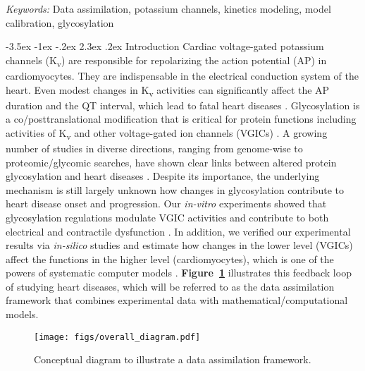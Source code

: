 \documentclass[11pt]{article}
\makeatletter
\renewcommand\section{\@startsection {section}{1}{\z@}%
                                   {-3.5ex \@plus -1ex \@minus -.2ex}%
                                   {2.3ex \@plus.2ex}%
                                   {\normalfont\fontfamily{phv}\fontsize{16}{19}\bfseries}}
\makeatother
\begin{document}
\noindent%
{\it Keywords:} Data assimilation, potassium channels, kinetics modeling, model calibration, glycosylation

{} %

\section{Introduction}
Cardiac voltage-gated potassium channels (K\textsubscript{v}) are responsible for repolarizing the action potential (AP) in cardiomyocytes. They are indispensable in the electrical conduction system of the heart. Even modest changes in K\textsubscript{v} activities can significantly affect the AP duration and the QT interval, which lead to fatal heart diseases \citep{ravens2008role}. Glycosylation is a co/posttranslational modification that is critical for protein functions including activities of K\textsubscript{v} and other voltage-gated ion channels (VGICs) \citep{ohtsubo2006glycosylation,ednie2012modulation}. A growing number of studies in diverse directions, ranging from genome-wise to proteomic/glycomic searches, have shown clear links between altered protein glycosylation and heart diseases \citep{yung2004gene,yang2015glycoproteins,miura2016glycomics,nagai2016aberrant}. Despite its importance, the underlying mechanism is still largely unknown how changes in glycosylation contribute to heart disease onset and progression. Our \textit{in-vitro} experiments showed that glycosylation regulations modulate VGIC activities and contribute to both electrical and contractile dysfunction \citep{ednie2013sialicNav1,ednie2015sialicKv,ednie2019reduced}. In addition, we verified our experimental results via \textit{in-silico} studies and estimate how changes in the lower level (VGICs) affect the functions in the higher level (cardiomyocytes), which is one of the powers of systematic computer models \citep{du2013silico,du2015statistical,du2017silico,kim2022simulation}. \textbf{Figure~\ref{fig:framework_diagram}} illustrates this feedback loop of studying heart diseases, which will be referred to as the data assimilation framework that combines experimental data with mathematical/computational models.
\begin{figure}[!ht]
    \centering
    \texttt{[image: figs/overall\_diagram.pdf]}
    \caption{Conceptual diagram to illustrate a data assimilation framework.}
    \label{fig:framework_diagram}
\end{figure}
\end{document}
